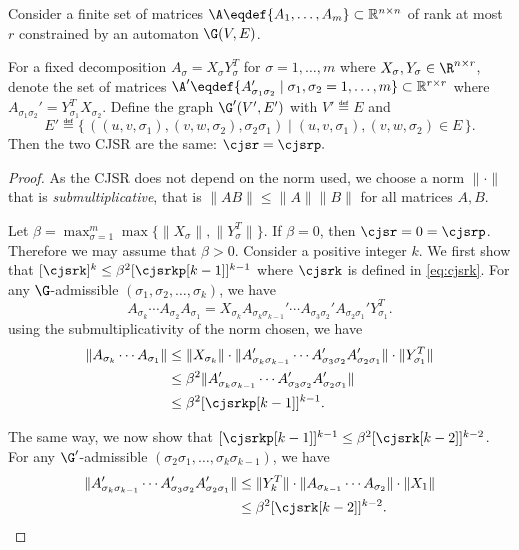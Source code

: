 \begin{mytheo}
  \label{theo:lowrank}
  Consider a finite set of matrices $\A \eqdef \{A_1, \ldots, A_m\} \subset \mathbb{R}^{n \times n}$ of rank at most $r$
  constrained by an automaton $\G(V,E)$.

  For a fixed decomposition $A_\sigma = X_\sigma Y_\sigma^T$ for $\sigma = 1, \ldots, m$ where $X_\sigma, Y_\sigma \in \R^{n \times r}$,
  denote the set of matrices $\A' \eqdef \{A_{\sigma_1\sigma_2}' \mid \sigma_1, \sigma_2 = 1, \ldots, m\} \subset \mathbb{R}^{r \times r}$ where $A_{\sigma_1\sigma_2}' = Y_{\sigma_1}^TX_{\sigma_2}$.
  Define the graph $\G'(V',E')$ with $V' \eqdef E$ and
  \[
    E' \eqdef \{\, ((u,v,\sigma_1), (v,w,\sigma_2), \sigma_2\sigma_1) \mid (u,v,\sigma_1),(v,w,\sigma_2) \in E \,\}.
  \]
  Then the two CJSR are the same:
  \( \cjsr = \cjsrp. \)
  \begin{proof}
    As the CJSR does not depend on the norm used, we choose a norm $\|\cdot\|$ that is \emph{submultiplicative},
    that is $\|AB\| \leq \|A\| \|B\|$ for all matrices $A,B$.

    Let $\beta = \max_{\sigma=1}^m\max\{\|X_\sigma\|, \|Y_\sigma^T\|\}$.
    If $\beta = 0$, then $\cjsr = 0 = \cjsrp$.
    Therefore we may assume that $\beta > 0$.
    Consider a positive integer $k$.
    We first show that $[\cjsrk]^k \leq \beta^2[\cjsrkp[k-1]]^{k-1}$
    where $\cjsrk$ is defined in \eqref{eq:cjsrk}.
    For any $\G$-admissible $(\sigma_1, \sigma_2, \ldots, \sigma_k)$, we have
    \begin{equation*}
      \label{eq:redu}
      A_{\sigma_k} \cdots A_{\sigma_2}A_{\sigma_1} = X_{\sigma_k}A_{\sigma_k\sigma_{k-1}}' \cdots A_{\sigma_3\sigma_2}' A_{\sigma_2\sigma_1}'Y_{\sigma_1}^T.
    \end{equation*}
    using
    the submultiplicativity of the norm chosen, we have
    \begin{align*}
      \|A_{\sigma_k} \cdots A_{\sigma_1}\|
      & \leq \|X_{\sigma_k}\| \cdot \|A_{\sigma_k\sigma_{k-1}}' \cdots A_{\sigma_3\sigma_2}' A_{\sigma_2\sigma_1}'\| \cdot \|Y_{\sigma_1}^T\|\\
      & \leq \beta^2\|A_{\sigma_k\sigma_{k-1}}' \cdots A_{\sigma_3\sigma_2}' A_{\sigma_2\sigma_1}'\|\\
      & \leq \beta^2 [\cjsrkp[k-1]]^{k-1}.
    \end{align*}

    The same way, we now show that $[\cjsrkp[k-1]]^{k-1} \leq \beta^2 [\cjsrk[k-2]]^{k-2}$.
    For any $\G'$-admissible $(\sigma_2\sigma_1, \ldots, \sigma_k\sigma_{k-1})$, we have
    \begin{align*}
      \|A_{\sigma_k\sigma_{k-1}}' \cdots A_{\sigma_3\sigma_2}' A_{\sigma_2\sigma_1}'\|
      & \leq \|Y_k^T\| \cdot \|A_{\sigma_{k-1}} \cdots A_{\sigma_2}\| \cdot \|X_1\|\\
      & \leq \beta^2 [\cjsrk[k-2]]^{k-2}.
    \end{align*}


\end{proof}
\end{mytheo}
